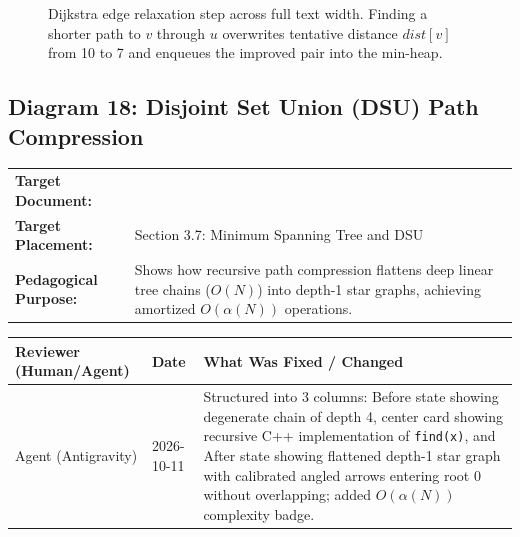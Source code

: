 \documentclass[11pt,a4paper]{article}
\newcommand{\breadcrumb}[3]{
    \par\vspace{0.15cm}
    \noindent\begin{tabularx}{\textwidth}{|l|X|}
    \hline
    \textbf{Target Document:} & \texttt{\detokenize{#1}} \\
    \textbf{Target Placement:} & #2 \\
    \textbf{Pedagogical Purpose:} & #3 \\
    \hline
    \end{tabularx}
    \vspace{0.15cm}\par
}
\newcommand{\diagramaudit}[3]{
    \par\vspace{0.12cm}
    \noindent\begin{tabularx}{\textwidth}{|l|l|>{\raggedright\arraybackslash}X|}
    \hline
    \textbf{Reviewer (Human/Agent)} & \textbf{Date} & \textbf{What Was Fixed / Changed} \\ \hline
    #1 & #2 & #3 \\ \hline
    \end{tabularx}
    \vspace{0.12cm}\par
}
\begin{document}
\begin{figure}[htbp]
\caption{Dijkstra edge relaxation step across full text width. Finding a shorter path to $v$ through $u$ overwrites tentative distance $dist[v]$ from 10 to 7 and enqueues the improved pair into the min-heap.}
\end{figure}

\newpage
\subsection{Diagram 18: Disjoint Set Union (DSU) Path Compression}

\breadcrumb{07.graph_algorithms.tex}{Section 3.7: Minimum Spanning Tree and DSU}{Shows how recursive path compression flattens deep linear tree chains ($O(N)$) into depth-1 star graphs, achieving amortized $O(\alpha(N))$ operations.}

\diagramaudit{Agent (Antigravity)}{2026-10-11}{Structured into 3 columns: Before state showing degenerate chain of depth 4, center card showing recursive C++ implementation of \texttt{find(x)}, and After state showing flattened depth-1 star graph with calibrated angled arrows entering root 0 without overlapping; added $O(\alpha(N))$ complexity badge.}
\end{document}
